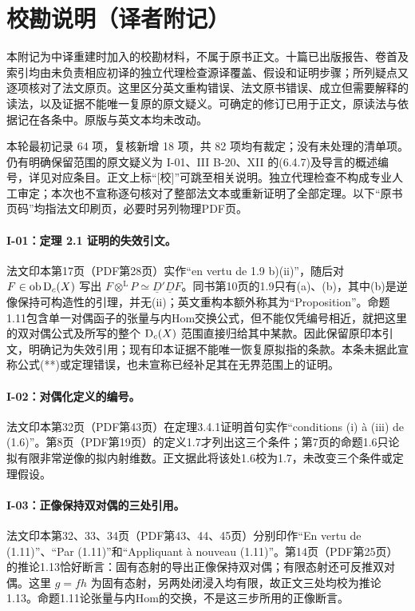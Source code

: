 \clearpage{}\section*{校勘说明（译者附记）}

本附记为中译重建时加入的校勘材料，不属于原书正文。十篇已出版报告、卷首及索引均由未负责相应初译的独立代理检查源译覆盖、假设和证明步骤；所列疑点又逐项核对了法文原页。这里区分英文重构错误、法文原书错误、成立但需要解释的读法，以及证据不能唯一复原的原文疑义。可确定的修订已用于正文，原读法与依据记在各条中。原版与英文本均未改动。

本轮最初记录 64 项，复核新增 18 项，共 82 项均有裁定；没有未处理的清单项。仍有明确保留范围的原文疑义为 I-01、III B-20、XII 的(6.4.7)及导言的概述编号，详见对应条目。正文上标“[校]”可跳至相关说明。独立代理检查不构成专业人工审定；本次也不宣称逐句核对了整部法文本或重新证明了全部定理。以下“原书页码”均指法文印刷页，必要时另列物理PDF页。

\hypertarget{collation-I-01}{}

\paragraph*{I-01：定理 2.1 证明的失效引文。}法文印本第17页（PDF第28页）实作“en vertu de 1.9 b)(ii)”，随后对 $F\in\operatorname{ob}\mathrm{D}_c(X)$ 写出 $F\otimes^{\mathrm L}P\simeq\underline D'\underline DF$。同书第10页的1.9只有(a)、(b)，其中(b)是逆像保持可构造性的引理，并无(ii)；英文重构本额外称其为“Proposition”。命题1.11包含单一对偶函子的张量与内Hom交换公式，但不能仅凭编号相近，就把这里的双对偶公式及所写的整个 $\mathrm{D}_c(X)$ 范围直接归给其中某款。因此保留原印本引文，明确记为失效引用；现有印本证据不能唯一恢复原拟指的条款。本条未据此宣称公式(**)或定理错误，也未宣称已经补足其在无界范围上的证明。

\hypertarget{collation-I-02}{}

\paragraph*{I-02：对偶化定义的编号。}法文印本第32页（PDF第43页）在定理3.4.1证明首句实作“conditions (i) à (iii) de (1.6)”。第8页（PDF第19页）的定义1.7才列出这三个条件；第7页的命题1.6只论拟有限非常逆像的拟内射维数。正文据此将该处1.6校为1.7，未改变三个条件或定理假设。

\hypertarget{collation-I-03}{}

\paragraph*{I-03：正像保持双对偶的三处引用。}法文印本第32、33、34页（PDF第43、44、45页）分别印作“En vertu de (1.11)”、“Par (1.11)”和“Appliquant à nouveau (1.11)”。第14页（PDF第25页）的推论1.13恰好断言：固有态射的导出正像保持双对偶；有限态射还可反推双对偶。这里 $g=fh$ 为固有态射，另两处闭浸入均有限，故正文三处均校为推论1.13。命题1.11论张量与内Hom的交换，不是这三步所用的正像断言。

